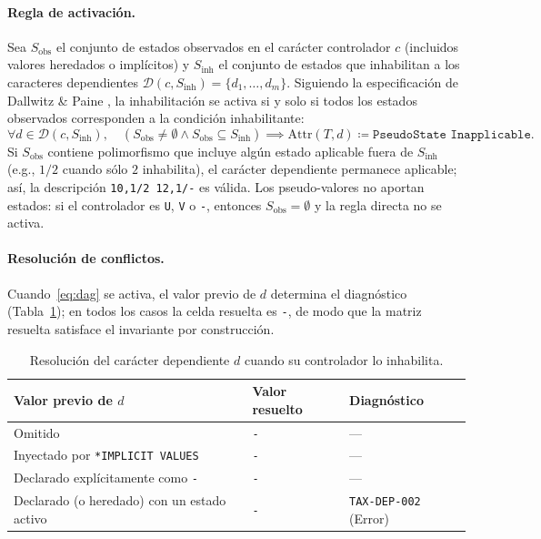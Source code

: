 \documentclass[11pt,a4paper]{article}
\theoremstyle{definition}
\theoremstyle{remark}
\newcommand{\Sobs}{S_{\text{obs}}}
\newcommand{\Sinh}{S_{\text{inh}}}
\begin{document}
\paragraph{Regla de activación.} Sea $\Sobs$ el conjunto de estados observados en el carácter controlador $c$ (incluidos valores heredados o implícitos) y $\Sinh$ el conjunto de estados que inhabilitan a los caracteres dependientes $\mathcal{D}(c, \Sinh) = \{d_1, \dots, d_m\}$. Siguiendo la especificación de Dallwitz \& Paine \cite{dallwitzpaine1986}, la inhabilitación se activa si y solo si todos los estados observados corresponden a la condición inhabilitante:
\begin{equation}
\label{eq:dag}
\forall d \in \mathcal{D}(c, \Sinh), \quad (\Sobs \neq \emptyset \land \Sobs \subseteq \Sinh) \implies \text{Attr}(T, d) \coloneqq \texttt{PseudoState Inapplicable}.
\end{equation}
Si $\Sobs$ contiene polimorfismo que incluye algún estado aplicable fuera de $\Sinh$ (e.g., $1/2$ cuando sólo $2$ inhabilita), el carácter dependiente permanece aplicable; así, la descripción \texttt{10,1/2 12,1/-} es válida. Los pseudo-valores no aportan estados: si el controlador es \texttt{U}, \texttt{V} o \texttt{-}, entonces $\Sobs = \emptyset$ y la regla directa no se activa.

\paragraph{Resolución de conflictos.} Cuando~\eqref{eq:dag} se activa, el valor previo de $d$ determina el diagnóstico (Tabla~\ref{tab:conflictos}); en todos los casos la celda resuelta es \texttt{-}, de modo que la matriz resuelta satisface el invariante por construcción.

\begin{table}[ht]
\centering
\small
\caption{Resolución del carácter dependiente $d$ cuando su controlador lo inhabilita.}
\label{tab:conflictos}
\begin{tabularx}{\textwidth}{@{}X l l@{}}
\toprule
\textbf{Valor previo de $d$} & \textbf{Valor resuelto} & \textbf{Diagnóstico} \\
\midrule
Omitido & \texttt{-} & --- \\
Inyectado por \texttt{*IMPLICIT VALUES} & \texttt{-} & --- \\
Declarado explícitamente como \texttt{-} & \texttt{-} & --- \\
Declarado (o heredado) con un estado activo & \texttt{-} & \texttt{TAX-DEP-002} (Error) \\
\bottomrule
\end{tabularx}
\end{table}
\end{document}
